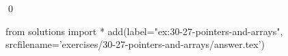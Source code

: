 
\begin{ex}
  \label{ex:30-27-pointers-and-arrays}
  
  \qed
\end{ex}
\begin{python0}
from solutions import *
add(label="ex:30-27-pointers-and-arrays",
    srcfilename='exercises/30-27-pointers-and-arrays/answer.tex')
\end{python0}
